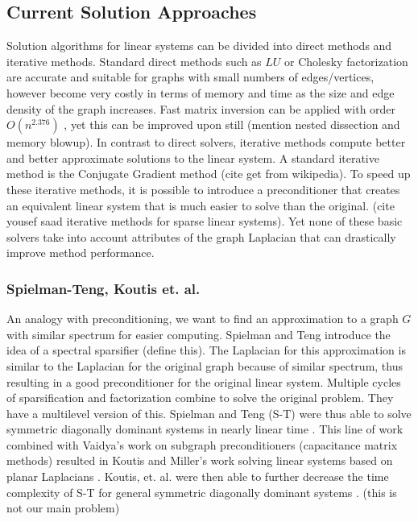 \documentclass{article}
\begin{document}
\subsection{Current Solution Approaches}
Solution algorithms for linear systems can be divided into direct methods and iterative methods. Standard direct methods such as $LU$ or Cholesky factorization are accurate and suitable for graphs with small numbers of edges/vertices, however become very costly in terms of memory and time as the size and edge density of the graph increases. Fast matrix inversion can be applied with order $O(n^{2.376})$ \cite{Spielman:2010}, yet this can be improved upon still (mention nested dissection and memory blowup). In contrast to direct solvers, iterative methods compute better and better approximate solutions to the linear system. A standard iterative method is the Conjugate Gradient method (cite get from wikipedia). To speed up these iterative methods, it is possible to introduce a preconditioner that creates an equivalent linear system that is much easier to solve than the original. (cite yousef saad iterative methods for sparse linear systems). Yet none of these basic solvers take into account attributes of the graph Laplacian that can drastically improve method performance.

\subsubsection{Spielman-Teng, Koutis et. al.}
An analogy with preconditioning, we want to find an approximation to a graph $G$ with similar spectrum for easier computing. Spielman and Teng introduce the idea of a spectral sparsifier (define this). The Laplacian for this approximation is similar to the Laplacian for the original graph because of similar spectrum, thus resulting in a good preconditioner for the original linear system. Multiple cycles of sparsification and factorization combine to solve the original problem. They have a multilevel version of this. Spielman and Teng (S-T) were thus able to solve symmetric diagonally dominant systems in nearly linear time \cite{Spielman:2008}.  This line of work combined with Vaidya's \cite{Vaidya:1991} work on subgraph preconditioners (capacitance matrix methods) resulted in Koutis and Miller's work solving linear systems based on planar Laplacians \cite{Koutis:2007}. Koutis, et. al. were then able to further decrease the time complexity of S-T for general symmetric diagonally dominant systems \cite{Koutis:2010}. (this is not our main problem)
\end{document}
